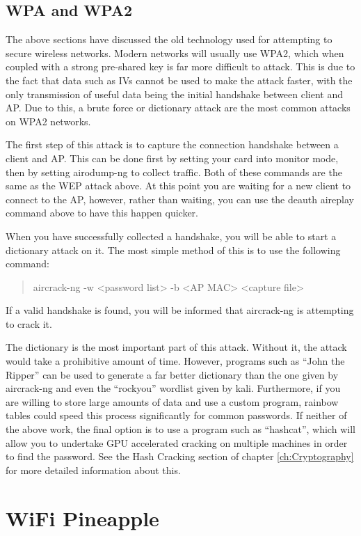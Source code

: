 \documentclass[a4paper,11pt]{report}
\begin{document}
		\subsection{WPA and WPA2}
			The above sections have discussed the old technology used for attempting to secure wireless networks. 
			Modern networks will usually use WPA2, which when coupled with a strong pre-shared key is far more difficult to attack. 
			This is due to the fact that data such as IVs cannot be used to make the attack faster, with the only transmission of useful data being the initial handshake between client and AP. 
			Due to this, a brute force or dictionary attack are the most common attacks on WPA2 networks. 

			The first step of this attack is to capture the connection handshake between a client and AP. 
			This can be done first by setting your card into monitor mode, then by setting airodump-ng to collect traffic. 
			Both of these commands are the same as the WEP attack above. 
			At this point you are waiting for a new client to connect to the AP, however, rather than waiting, you can use the deauth aireplay command above to have this happen quicker. 

			When you have successfully collected a handshake, you will be able to start a dictionary attack on it. 
			The most simple method of this is to use the following command:
			\begin{quote}
				aircrack-ng -w <password list> -b <AP MAC> <capture file>
			\end{quote}
			If a valid handshake is found, you will be informed that aircrack-ng is attempting to crack it. 

			The dictionary is the most important part of this attack. 
			Without it, the attack would take a prohibitive amount of time. 
			However, programs such as ``John the Ripper'' can be used to generate a far better dictionary than the one given by aircrack-ng and even the ``rockyou'' wordlist given by kali. 
			Furthermore, if you are willing to store large amounts of data and use a custom program, rainbow tables could speed this process significantly for common passwords. 
			If neither of the above work, the final option is to use a program such as ``hashcat'', which will allow you to undertake GPU accelerated cracking on multiple machines in order to find the password. 
			See the Hash Cracking section of chapter \ref{ch:Cryptography} for more detailed information about this. 
	\section{WiFi Pineapple}
\end{document}
